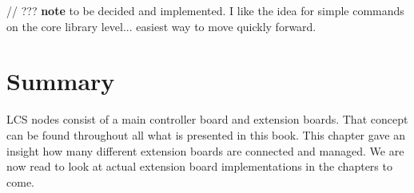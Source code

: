 // ??? \textbf{note}  to be decided and implemented. I like the idea for simple commands on the core library level... easiest way to move quickly forward.

\section{Summary}

LCS nodes consist of a main controller board and extension boards. That concept can be found throughout all what is presented in this book. This chapter gave an insight how many different extension boards are connected and managed. We are now read to look at actual extension board implementations in the chapters to come.

